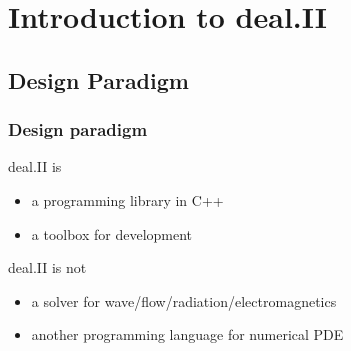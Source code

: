 \section[Intro]{Introduction to deal.II}
\subsection{Design Paradigm}

\begin{frame}
  \frametitle{Design paradigm}
  deal.II is
  \begin{itemize}
  \item a programming library in C++
  \item a toolbox for development
  \end{itemize}
  \pause
  deal.II is not
  \begin{itemize}
  \item a solver for wave/flow/radiation/electromagnetics
  \item another programming language for numerical PDE
  \end{itemize}
\end{frame}

